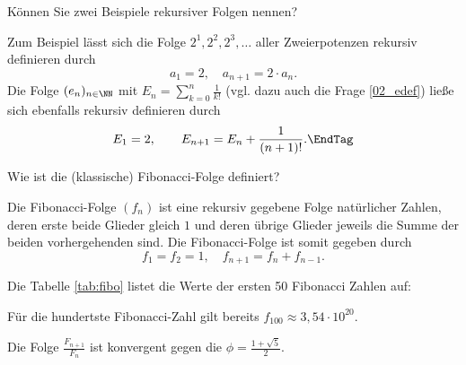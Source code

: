 \begin{frage}
  Können Sie zwei Beispiele rekursiver Folgen nennen?
\end{frage}

\begin{antwort}
  Zum Beispiel lässt sich die Folge $2^1, 2^2, 2^3,\ldots$ 
  aller Zweierpotenzen rekursiv definieren durch
  \[
  a_1=2, \quad a_{n+1} = 2\cdot a_n.
  \]
  Die Folge $(e_n)_{n\in\NN}$ mit $E_n=\sum_{k=0}^n \frac{1}{k!}$ 
  (vgl. dazu auch die Frage \ref{02_edef})
  ließe sich ebenfalls rekursiv definieren durch
  \[
  E_1 =2, \qquad E_{n+1} = E_n + \frac{1}{(n+1)!}.\EndTag
  \] 
\end{antwort} 



\begin{frage}%
  \label{02_fib}
  Wie ist die (klassische) Fibonacci-Folge definiert?
\end{frage}

\begin{antwort}
  Die Fibonacci-Folge $(f_n)$ ist eine rekursiv gegebene Folge 
  natürlicher Zahlen, deren erste beide Glieder gleich $1$ und 
  deren übrige Glieder jeweils die Summe der beiden vorhergehenden sind. 
  Die Fibonacci-Folge ist somit gegeben durch  
  \begin{equation}
    f_1=f_2=1,\quad f_{n+1}=f_{n}+f_{n-1}.
  \end{equation}

Die Tabelle \ref{tab:fibo} listet die Werte der ersten 50 Fibonacci Zahlen auf:



Für die hundertste Fibonacci-Zahl gilt bereits $f_{100} \approx 3,54\cdot 10^{20}$.

Die Folge $\frac{F_{n+1}}{F_n}$ ist konvergent gegen die 
 $\phi = \frac{1+\sqrt{5}}{2}$. \AntEnd\end{antwort}


